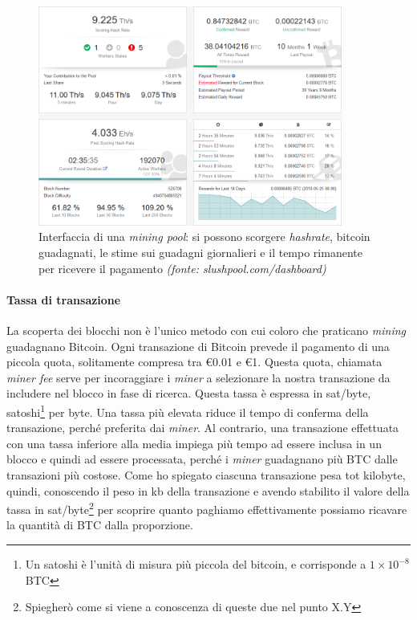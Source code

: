 \documentclass {article}
\begin{document}
\vspace {0.5cm}
\begin{figure}[htb!]
\includegraphics [width = 10cm] {dashboard.png}
\centering
\caption {Interfaccia di una \textit{mining pool}: si possono scorgere \textit{hashrate}, bitcoin guadagnati, le stime sui guadagni giornalieri e il tempo rimanente per ricevere il pagamento \textit{(fonte: slushpool.com/dashboard)}}
\end{figure}
\vspace {0.2cm}

\paragraph {Tassa di transazione}

La scoperta dei blocchi non è l'unico metodo con cui coloro che praticano \textit{mining} guadagnano Bitcoin.
Ogni transazione di Bitcoin prevede il pagamento di una piccola quota, solitamente compresa tra \euro{0.01} e \euro{1}.
Questa quota, chiamata \textit{miner fee} serve per incoraggiare i \textit{miner} a selezionare la nostra transazione da includere nel blocco in fase di ricerca.
Questa tassa è espressa in sat/byte, satoshi\footnote{Un satoshi è l'unità di misura più piccola del bitcoin, e corrisponde a $1 \times 10^{-8}$ BTC} per byte.
Una tassa più elevata riduce il tempo di conferma della transazione, perché preferita dai \textit{miner}. Al contrario, una transazione effettuata con una tassa inferiore alla media impiega più tempo ad essere inclusa in un blocco e quindi ad essere processata, perché i \textit{miner} guadagnano più BTC dalle transazioni più costose.
Come ho spiegato ciascuna transazione pesa tot kilobyte, quindi, conoscendo il peso in kb della transazione e avendo stabilito il valore della tassa in sat/byte\footnote{Spiegherò come si viene a conoscenza di queste due nel punto X.Y} per scoprire quanto paghiamo effettivamente possiamo ricavare la quantità di BTC dalla proporzione.
\end{document}
